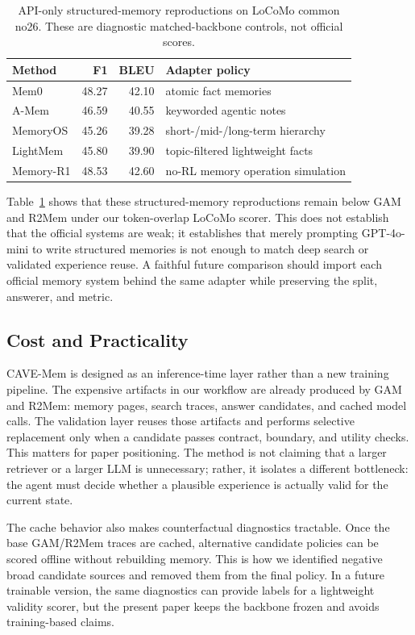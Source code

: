\documentclass[conference]{IEEEtran}
\newcommand{\method}{CAVE-Mem}
\begin{document}
\begin{table}[t]
\caption{API-only structured-memory reproductions on LoCoMo common no26.
These are diagnostic matched-backbone controls, not official scores.}
\label{tab:external}
\centering
\scriptsize
\begin{tabular}{lrrp{}}
\toprule
Method & F1 & BLEU & Adapter policy \\
\midrule
Mem0 & 48.27 & 42.10 & atomic fact memories \\
A-Mem & 46.59 & 40.55 & keyworded agentic notes \\
MemoryOS & 45.26 & 39.28 & short-/mid-/long-term hierarchy \\
LightMem & 45.80 & 39.90 & topic-filtered lightweight facts \\
Memory-R1 & 48.53 & 42.60 & no-RL memory operation simulation \\
\bottomrule
\end{tabular}
\end{table}

Table~\ref{tab:external} shows that these structured-memory reproductions
remain below GAM and R2Mem under our token-overlap LoCoMo scorer. This does
not establish that the official systems are weak; it establishes that merely
prompting GPT-4o-mini to write structured memories is not enough to match
deep search or validated experience reuse. A faithful future comparison
should import each official memory system behind the same adapter while
preserving the split, answerer, and metric.

\subsection{Cost and Practicality}
\method{} is designed as an inference-time layer rather than a new training
pipeline. The expensive artifacts in our workflow are already produced by GAM
and R2Mem: memory pages, search traces, answer candidates, and cached model
calls. The validation layer reuses those artifacts and performs selective
replacement only when a candidate passes contract, boundary, and utility
checks. This matters for paper positioning. The method is not claiming that a
larger retriever or a larger LLM is unnecessary; rather, it isolates a
different bottleneck: the agent must decide whether a plausible experience is
actually valid for the current state.

The cache behavior also makes counterfactual diagnostics tractable. Once the
base GAM/R2Mem traces are cached, alternative candidate policies can be scored
offline without rebuilding memory. This is how we identified negative broad
candidate sources and removed them from the final policy. In a future
trainable version, the same diagnostics can provide labels for a lightweight
validity scorer, but the present paper keeps the backbone frozen and avoids
training-based claims.
\end{document}
